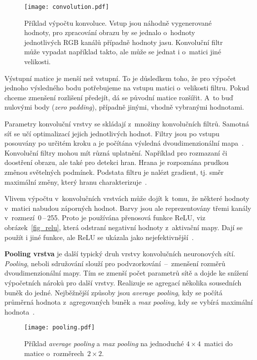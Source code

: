 \begin{figure}[H]
    \centering
    \texttt{[image: convolution.pdf]}
    \caption[Příklad výpočtu konvoluce]{Příklad výpočtu konvoluce. Vstup jsou náhodně vygenerované hodnoty, pro zpracování obrazu by se jednalo o~hodnoty jednotlivých RGB kanálů případně hodnoty jasu. Konvoluční filtr může vypadat například takto, ale může se jednat i o~matici jiné velikosti.}
    \label{fig_conv_ex}
\end{figure}

Výstupní matice je menší než vstupní. To je důsledkem toho, že pro výpočet jednoho výsledného bodu potřebujeme na vstupu matici o~velikosti filtru. Pokud chceme zmenšení rozlišení předejít, dá se původní matice rozšířit. A~to buď nulovými body (\textit{zero padding}), případně
jinými, vhodně vybranými hodnotami.

Parametry konvoluční vrstvy se skládají z~množiny konvolučních filtrů. Samotná síť se učí optimalizací jejich jednotlivých hodnot. Filtry jsou po vstupu posouvány po určitém kroku a je počítána výsledná dvoudimenzionální mapa~\cite{paperLecunNature}. Konvoluční filtry mohou mít různá uplatnění. Například pro rozmazaní či doostření obrazu, ale také pro  detekci hran. Hrana je rozpoznána prudkou změnou světelných podmínek. Podstata filtru je nalézt gradient, tj. směr maximální změny, který hranu charakterizuje~\cite{mendeluDigital}.

Vlivem výpočtu v~konvolučních vrstvách může dojít k~tomu, že některé hodnoty v~matici nabudou záporných hodnot. Barvy jsou ale reprezentovány třemi kanály v~rozmezí~0\,--\,255. Proto je používána přenosová funkce ReLU, viz obrázek~\ref{fig_relu}, která odstraní negativní hodnoty z~aktivační mapy. Dají se použít i jiné funkce, ale ReLU se ukázala jako nejefektivnější~\cite{paperKriz}.


\textbf{Pooling vrstva} je další typický druh vrstvy konvolučních neuronových sítí. \textit{Pooling}, neboli sdružování slouží pro podvzorkování~--~zmenšení rozměrů dvoudimenzionální mapy. Tím se zmenší počet parametrů sítě a dojde ke snížení výpočetních nároků pro další vrstvy. Realizuje se agregací několika sousedních buněk do jedné. Nejběžnější způsoby jsou \textit{average pooling}, kdy se počítá průměrná hodnota z~agregovaných buněk a \textit{max pooling}, kdy se vybírá maximální hodnota~\cite{paperLecunNature}.

\begin{figure}[H]
    \centering
    \texttt{[image: pooling.pdf]}
    \caption[Příklad max a averige poolingu]{Příklad \textit{average pooling} a \textit{max pooling} na jednoduché $4 \times 4$~matici do matice o~rozměrech~$2 \times 2$.}
    \label{fig_pooling_ex}
\end{figure}

